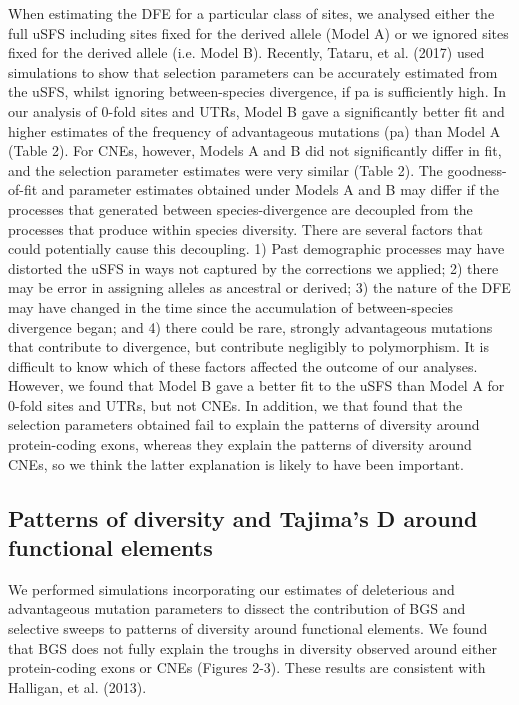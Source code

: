 When estimating the DFE for a particular class of sites, we analysed either the full uSFS including sites fixed for the derived allele (Model A) or we ignored sites fixed for the derived allele (i.e. Model B). Recently, Tataru, et al. (2017) used simulations to show that selection parameters can be accurately estimated from the uSFS, whilst ignoring between-species divergence, if pa is sufficiently high. In our analysis of 0-fold sites and UTRs, Model B gave a significantly better fit and higher estimates of the frequency of advantageous mutations (pa) than Model A (Table 2). For CNEs, however, Models A and B did not significantly differ in fit, and the selection parameter estimates were very similar (Table 2). The goodness-of-fit and parameter estimates obtained under Models A and B may differ if the processes that generated between species-divergence are decoupled from the processes that produce within species diversity. There are several factors that could potentially cause this decoupling. 1) Past demographic processes may have distorted the uSFS in ways not captured by the corrections we applied; 2) there may be error in assigning alleles as ancestral or derived; 3) the nature of the DFE may have changed in the time since the accumulation of between-species divergence began; and 4) there could be rare, strongly advantageous mutations that contribute to divergence, but contribute negligibly to polymorphism. It is difficult to know which of these factors affected the outcome of our analyses. However, we found that Model B gave a better fit to the uSFS than Model A for 0-fold sites and UTRs, but not CNEs. In addition, we that found that the selection parameters obtained fail to explain the patterns of diversity around protein-coding exons, whereas they explain the patterns of diversity around CNEs, so we think the latter explanation is likely to have been important. 

\subsection{Patterns of diversity and Tajima’s D around functional elements}

We performed simulations incorporating our estimates of deleterious and advantageous mutation parameters to dissect the contribution of BGS and selective sweeps to patterns of diversity around functional elements. We found that BGS does not fully explain the troughs in diversity observed around either protein-coding exons or CNEs (Figures 2-3). These results are consistent with Halligan, et al. (2013).

